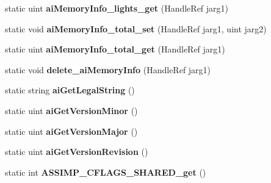 \begin{DoxyCompactItemize}
\item 
\hypertarget{class_assimp_p_i_n_v_o_k_e_ab427ed4f0a77850dc4ec1be8f552bc57}{static uint {\bfseries ai\+Memory\+Info\+\_\+lights\+\_\+get} (Handle\+Ref jarg1)}\label{class_assimp_p_i_n_v_o_k_e_ab427ed4f0a77850dc4ec1be8f552bc57}

\item 
\hypertarget{class_assimp_p_i_n_v_o_k_e_abe191eed0b090478f110df93a9ecedfe}{static void {\bfseries ai\+Memory\+Info\+\_\+total\+\_\+set} (Handle\+Ref jarg1, uint jarg2)}\label{class_assimp_p_i_n_v_o_k_e_abe191eed0b090478f110df93a9ecedfe}

\item 
\hypertarget{class_assimp_p_i_n_v_o_k_e_adb7d1730a962c403bbca57d9ff4dc8eb}{static uint {\bfseries ai\+Memory\+Info\+\_\+total\+\_\+get} (Handle\+Ref jarg1)}\label{class_assimp_p_i_n_v_o_k_e_adb7d1730a962c403bbca57d9ff4dc8eb}

\item 
\hypertarget{class_assimp_p_i_n_v_o_k_e_ad4704dead5069a20c4c729b6bbb03937}{static void {\bfseries delete\+\_\+ai\+Memory\+Info} (Handle\+Ref jarg1)}\label{class_assimp_p_i_n_v_o_k_e_ad4704dead5069a20c4c729b6bbb03937}

\item 
\hypertarget{class_assimp_p_i_n_v_o_k_e_aece71af9e44ad557c42d0b1e92e18c5f}{static string {\bfseries ai\+Get\+Legal\+String} ()}\label{class_assimp_p_i_n_v_o_k_e_aece71af9e44ad557c42d0b1e92e18c5f}

\item 
\hypertarget{class_assimp_p_i_n_v_o_k_e_a454b3547177a30fe058b111d80c4dd34}{static uint {\bfseries ai\+Get\+Version\+Minor} ()}\label{class_assimp_p_i_n_v_o_k_e_a454b3547177a30fe058b111d80c4dd34}

\item 
\hypertarget{class_assimp_p_i_n_v_o_k_e_a73496a93477fc1326e1cfd8f5a8691ac}{static uint {\bfseries ai\+Get\+Version\+Major} ()}\label{class_assimp_p_i_n_v_o_k_e_a73496a93477fc1326e1cfd8f5a8691ac}

\item 
\hypertarget{class_assimp_p_i_n_v_o_k_e_a65d51456d22dc881883990c892dc5716}{static uint {\bfseries ai\+Get\+Version\+Revision} ()}\label{class_assimp_p_i_n_v_o_k_e_a65d51456d22dc881883990c892dc5716}

\item 
\hypertarget{class_assimp_p_i_n_v_o_k_e_ae4e981c63b56d163ba8dc66dafb1f253}{static int {\bfseries A\+S\+S\+I\+M\+P\+\_\+\+C\+F\+L\+A\+G\+S\+\_\+\+S\+H\+A\+R\+E\+D\+\_\+get} ()}\label{class_assimp_p_i_n_v_o_k_e_ae4e981c63b56d163ba8dc66dafb1f253}


\end{DoxyCompactItemize}

